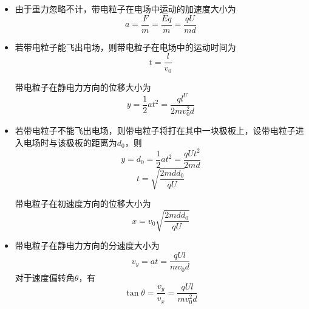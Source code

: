 \begin{itemize}
\item 由于重力忽略不计，带电粒子在电场中运动的加速度大小为
\begin{equation}
a = \frac{F}{m} = \frac{Eq}{m} = \frac{qU}{md}
\end{equation}

\item 若带电粒子能飞出电场，则带电粒子在电场中的运动时间为
\begin{equation}
t = \frac{l}{v_0}
\end{equation}

带电粒子在静电力方向的位移大小为
\begin{equation}
y = \frac12 at^2 = \frac{ql^U}{2mv_0^2 d}
\end{equation}

\item 若带电粒子不能飞出电场，则带电粒子将打在其中一块极板上，设带电粒子进入电场时与该极板的距离为$d_0$，则
\begin{equation}
y = d_0 = \frac12 at^2 = \frac{qUt^2}{2md}
\end{equation}
\begin{equation}
t = \sqrt{\frac{2mdd_0}{qU}}
\end{equation}

带电粒子在初速度方向的位移大小为
\begin{equation}
x = v_0\sqrt{\frac{2mdd_0}{qU}}
\end{equation}

\item 带电粒子在静电力方向的分速度大小为
\begin{equation}
v_y = at = \frac{qUl}{mv_0d}
\end{equation}
对于速度偏转角$\theta$，有
\begin{equation}
\tan \theta = \frac{v_y}{v_x} = \frac{qUl}{mv_0^2 d}
\end{equation}
\end{itemize}
